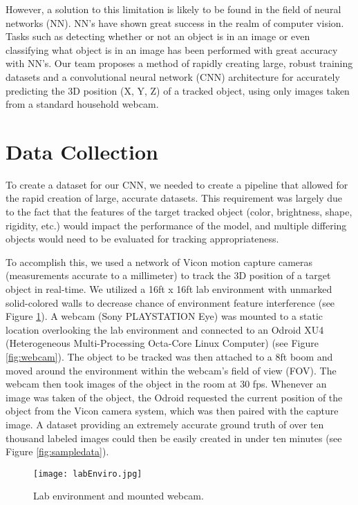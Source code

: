 \documentclass{article}
\begin{document}
However, a solution to this limitation is likely to be found in the field of neural networks (NN). NN's have shown great success in the realm of computer vision. Tasks such as detecting whether or not an object is in an image or even classifying what object is in an image has been performed with great accuracy with NN’s. Our team proposes a method of rapidly creating large, robust training datasets and a convolutional neural network (CNN) architecture for accurately predicting the 3D position (X, Y, Z) of a tracked object,  using only images taken from a standard household webcam.

\section{Data Collection}
\label{data_collect}

To create a dataset for our CNN, we needed to create a pipeline that allowed for the rapid creation of large, accurate datasets. This requirement was largely due to the fact that the features of the target tracked object (color, brightness, shape, rigidity, etc.) would impact the performance of the model, and multiple differing objects would need to be evaluated for tracking appropriateness.

To accomplish this, we used a network of Vicon motion capture cameras (measurements accurate to a millimeter) to track the 3D position of a target object in real-time. We utilized a 16ft x 16ft lab environment with unmarked solid-colored walls to decrease chance of environment feature interference (see Figure \ref{fig:lab}). A webcam (Sony PLAYSTATION Eye) was mounted to a static location overlooking the lab environment and connected to an Odroid XU4 (Heterogeneous Multi-Processing Octa-Core Linux Computer) (see Figure \ref{fig:webcam}). The object to be tracked was then attached to a 8ft boom and moved around the environment within the webcam's field of view (FOV). The webcam then took images of the object in the room at 30 fps. Whenever an image was taken of the object, the Odroid requested the current position of the object from the Vicon camera system, which was then paired with the capture image. A dataset providing an extremely accurate ground truth of over ten thousand labeled images could then be easily created in under ten minutes (see Figure \ref{fig:sampledata}).

\begin{figure}[h]
  \centering
  \texttt{[image: labEnviro.jpg]}
  \caption{Lab environment and mounted webcam.}
  \label{fig:lab}
\end{figure}
\end{document}
